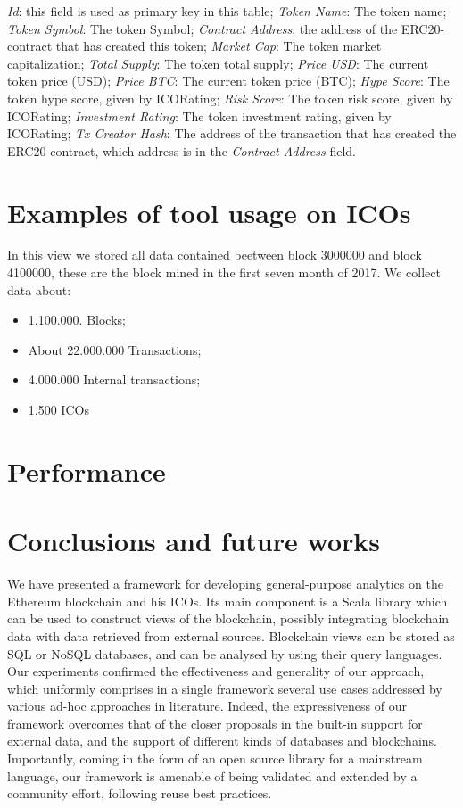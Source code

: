 \begin{outline}
        \2 \textit{Id}: this field is used as primary key in this table;
        \2 \textit{Token Name}: The token name;
        \2 \textit{Token Symbol}: The token Symbol;
        \2 \textit{Contract Address}: the address of the ERC20-contract that has created this token;
        \2 \textit{Market Cap}: The token market capitalization;
        \2 \textit{Total Supply}: The token total supply;
        \2 \textit{Price USD}: The current token price (USD);
        \2 \textit{Price BTC}: The current token price (BTC);
        \2 \textit{Hype Score}: The token hype score, given by ICORating;
        \2 \textit{Risk Score}: The token risk score, given by ICORating;
        \2 \textit{Investment Rating}: The token investment rating, given by ICORating;
        \2 \textit{Tx Creator Hash}: The address of the transaction that has created the ERC20-contract, which address is in the \textit{Contract Address} field.
\end{outline}

\section{Examples of tool usage on ICOs}
In this view we stored all data contained beetween block 3000000 and block 4100000, these are the block mined in the first seven month of 2017.
We collect data about:
\begin{itemize}
    \item 1.100.000. Blocks;
    \item About 22.000.000 Transactions;
    \item 4.000.000 Internal transactions;
    \item 1.500 ICOs
\end{itemize}

\section{Performance}

\section{Conclusions and future works}
We have presented a framework for developing general-purpose analytics on the Ethereum blockchain and his ICOs. Its main component is a Scala library which can be used to construct views of the blockchain, possibly integrating blockchain data with data retrieved from external sources. Blockchain views can be stored as SQL or NoSQL databases, and can be analysed by using their query languages. Our experiments confirmed the effectiveness and generality of our approach, which uniformly comprises in a single framework several use cases addressed by various ad-hoc approaches in literature. Indeed, the expressiveness of our framework overcomes that of the closer proposals in the built-in support for external data, and the support of different kinds of databases and blockchains.
Importantly, coming in the form of an open source library for a mainstream language, our framework is amenable of being validated and extended by a community effort, following reuse best practices.

